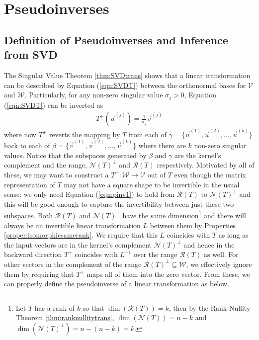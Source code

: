 \section{Pseudoinverses}

\subsection{Definition of Pseudoinverses and Inference from SVD}

The Singular Value Theorem \ref{thm:SVDtrans} shows that a linear transformation can be described by Equation (\ref{eqn:SVDT}) between the orthonormal bases for $\mathcal{V}$ and $\mathcal{W}$. Particularly, for any non-zero singular value $\sigma_j > 0$, Equation (\ref{eqn:SVDT}) can be inverted as
\begin{align}
T^+(\vec{u}^{(j)}) = \frac{1}{\sigma_j} \vec{v}^{(j)} \label{eqn:pinv1}
\end{align}
where now $T^+$ reverts the mapping by $T$ from each of $\gamma = \{\vec{u}^{(1)}, \vec{u}^{(2)},\ldots,\vec{u}^{(k)}\}$ back to each of $\beta = \{\vec{v}^{(1)}, \vec{v}^{(2)},\ldots,\vec{v}^{(k)}\}$ where there are $k$ non-zero singular values. Notice that the subspaces generated by $\beta$ and $\gamma$ are the kernel's complement and the range, $\mathcal{N}(T)^\perp$ and $\mathcal{R}(T)$ respectively. Motivated by all of these, we may want to construct a  $T^+: \mathcal{W} \to \mathcal{V}$ out of $T$ even though the matrix representation of $T$ may not have a square shape to be invertible in the usual sense: we only need Equation (\ref{eqn:pinv1}) to hold from $\mathcal{R}(T)$ to $\mathcal{N}(T)^\perp$ and this will be good enough to capture the invertibility between just these two subspaces. Both $\mathcal{R}(T)$ and $\mathcal{N}(T)^\perp$ have the same dimension\footnote{Let $T$ has a rank of $k$ so that $\dim(\mathcal{R}(T)) = k$, then by the Rank-Nullity Theorem \ref{thm:ranknullitytrans}, $\dim(\mathcal{N}(T)) = n-k$ and $\dim(\mathcal{N}(T)^\perp) = n-(n-k) = k$.} and there will always be an invertible linear transformation $L$ between them by Properties \ref{proper:isomorphicsamerank}. We require that this $L$ coincides with $T$ as long as the input vectors are in the kernel's complement $\mathcal{N}(T)^\perp$ and hence in the backward direction $T^+$ coincides with $L^{-1}$ over the range $\mathcal{R}(T)$ as well. For other vectors in the complement of the range $\mathcal{R}(T)^\perp \subseteq \mathcal{W}$, we effectively ignore them by requiring that $T^+$ maps all of them into the zero vector. From these, we can properly define the pseudoinverse of a linear transformation as below.
